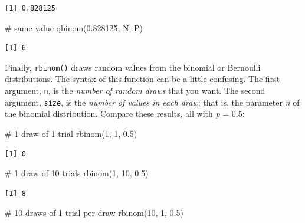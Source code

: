 \documentclass[
  13,
  letterpaper,
]{report}
\newenvironment{Shaded}{\begin{snugshade}}{\end{snugshade}}
\newcommand{\CommentTok}[1]{\textcolor[rgb]{0.37,0.37,0.37}{#1}}
\newcommand{\DecValTok}[1]{\textcolor[rgb]{0.68,0.00,0.00}{#1}}
\newcommand{\FloatTok}[1]{\textcolor[rgb]{0.68,0.00,0.00}{#1}}
\newcommand{\FunctionTok}[1]{\textcolor[rgb]{0.28,0.35,0.67}{#1}}
\newcommand{\NormalTok}[1]{\textcolor[rgb]{0.00,0.23,0.31}{#1}}
\begin{document}
\begin{verbatim}
[1] 0.828125
\end{verbatim}

\begin{Shaded}
\begin{Highlighting}[]
\CommentTok{\# same value}
\FunctionTok{qbinom}\NormalTok{(}\FloatTok{0.828125}\NormalTok{, N, P)}
\end{Highlighting}
\end{Shaded}

\begin{verbatim}
[1] 6
\end{verbatim}

Finally, \texttt{rbinom()} draws random values from the binomial or
Bernoulli distributions. The syntax of this function can be a little
confusing. The first argument, \texttt{n}, is the \emph{number of random
draws} that you want. The second argument, \texttt{size}, is the
\emph{number of values in each draw}; that is, the parameter \emph{n} of
the binomial distribution. Compare these results, all with \emph{p} =
0.5:

\begin{Shaded}
\begin{Highlighting}[]
\CommentTok{\# 1 draw of 1 trial}
\FunctionTok{rbinom}\NormalTok{(}\DecValTok{1}\NormalTok{, }\DecValTok{1}\NormalTok{, }\FloatTok{0.5}\NormalTok{)}
\end{Highlighting}
\end{Shaded}

\begin{verbatim}
[1] 0
\end{verbatim}

\begin{Shaded}
\begin{Highlighting}[]
\CommentTok{\# 1 draw of 10 trials}
\FunctionTok{rbinom}\NormalTok{(}\DecValTok{1}\NormalTok{, }\DecValTok{10}\NormalTok{, }\FloatTok{0.5}\NormalTok{)}
\end{Highlighting}
\end{Shaded}

\begin{verbatim}
[1] 8
\end{verbatim}

\begin{Shaded}
\begin{Highlighting}[]
\CommentTok{\# 10 draws of 1 trial per draw }
\FunctionTok{rbinom}\NormalTok{(}\DecValTok{10}\NormalTok{, }\DecValTok{1}\NormalTok{, }\FloatTok{0.5}\NormalTok{)}
\end{Highlighting}
\end{Shaded}
\end{document}
